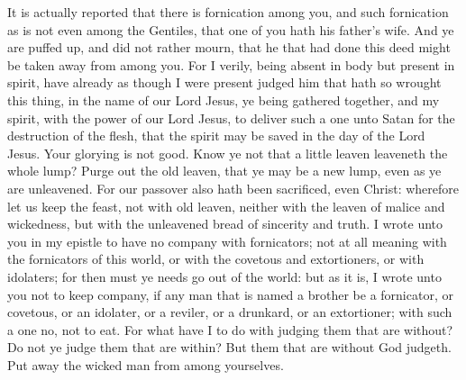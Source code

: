 It is actually reported that there is fornication among you, and such fornication as is not even among the Gentiles, that one of you hath his father’s wife. And ye are puffed up, and did not rather mourn, that he that had done this deed might be taken away from among you. For I verily, being absent in body but present in spirit, have already as though I were present judged him that hath so wrought this thing, in the name of our Lord Jesus, ye being gathered together, and my spirit, with the power of our Lord Jesus, to deliver such a one unto Satan for the destruction of the flesh, that the spirit may be saved in the day of the Lord Jesus. Your glorying is not good. Know ye not that a little leaven leaveneth the whole lump? Purge out the old leaven, that ye may be a new lump, even as ye are unleavened. For our passover also hath been sacrificed, even Christ: wherefore let us keep the feast, not with old leaven, neither with the leaven of malice and wickedness, but with the unleavened bread of sincerity and truth.  I wrote unto you in my epistle to have no company with fornicators; not at all meaning with the fornicators of this world, or with the covetous and extortioners, or with idolaters; for then must ye needs go out of the world: but as it is, I wrote unto you not to keep company, if any man that is named a brother be a fornicator, or covetous, or an idolater, or a reviler, or a drunkard, or an extortioner; with such a one no, not to eat. For what have I to do with judging them that are without? Do not ye judge them that are within? But them that are without God judgeth. Put away the wicked man from among yourselves. 

